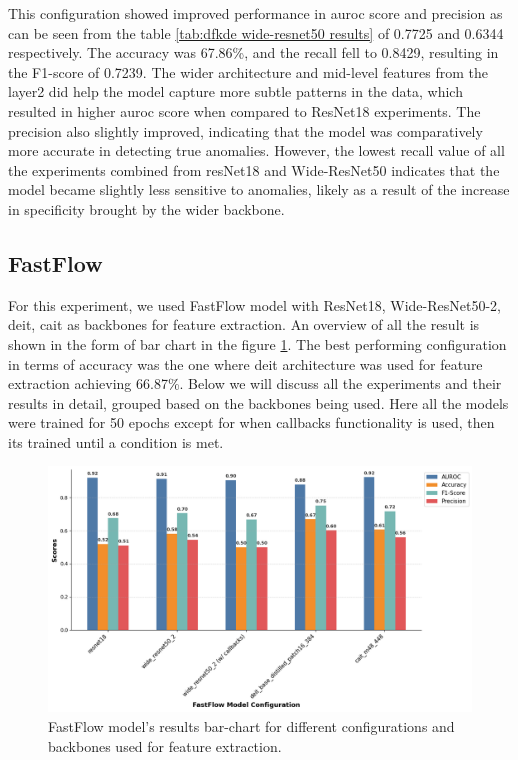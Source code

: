 This configuration showed improved performance in \gls{auroc} score and precision as can be seen from the table \ref{tab:dfkde wide-resnet50 results} of 0.7725 and 0.6344 respectively. The accuracy was 67.86\%, and the recall fell to 0.8429, resulting in the F1-score of 0.7239. The wider architecture and mid-level features from the layer2 did help the model capture more subtle patterns in the data, which resulted in higher \gls{auroc} score when compared to ResNet18 experiments. The precision also slightly improved, indicating that the model was comparatively more accurate in detecting true anomalies. However, the lowest recall value of all the experiments combined from resNet18 and Wide-ResNet50 indicates that the model became slightly less sensitive to anomalies, likely as a result of the increase in specificity brought by the wider backbone.

\subsection*{FastFlow}

For this experiment, we used FastFlow model with ResNet18, Wide-ResNet50-2, \gls{deit}, \gls{cait} as backbones for feature extraction. An overview of all the result is shown in the form of bar chart in the figure \ref{fig:fastflow model results}. The best performing configuration in terms of accuracy was the one where \gls{deit} architecture was used for feature extraction achieving 66.87\%. Below we will discuss all the experiments and their results in detail, grouped based on the backbones being used. Here all the models were trained for 50 epochs except for when callbacks functionality is used, then its trained until a condition is met.

\begin{figure}[H]
    \centering
    \includegraphics[width=1.2\linewidth]{Rohit_Master_Thesis//Images/fastflow_model_results.png}
    \caption{FastFlow model's results bar-chart for different configurations  and backbones used for feature extraction.}
    \label{fig:fastflow model results}
\end{figure}

